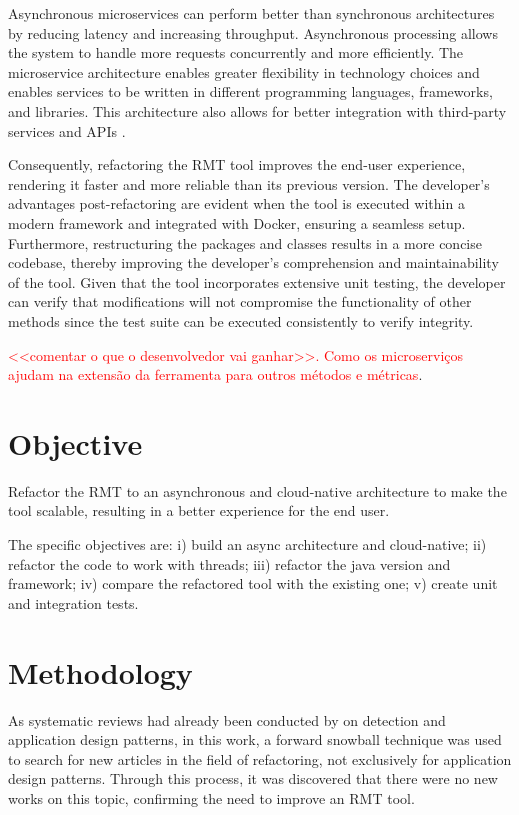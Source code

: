 Asynchronous microservices can perform better than synchronous architectures by reducing latency and increasing throughput. Asynchronous processing allows the system to handle more requests concurrently and more efficiently. The microservice architecture enables greater flexibility in technology choices and enables services to be written in different programming languages, frameworks, and libraries. This architecture also allows for better integration with third-party services and APIs \cite{larrucea2018}.

Consequently, refactoring the RMT tool improves the end-user experience, rendering it faster and more reliable than its previous version. The developer's advantages post-refactoring are evident when the tool is executed within a modern framework and integrated with Docker, ensuring a seamless setup. Furthermore, restructuring the packages and classes results in a more concise codebase, thereby improving the developer's comprehension and maintainability of the tool. Given that the tool incorporates extensive unit testing, the developer can verify that modifications will not compromise the functionality of other methods since the test suite can be executed consistently to verify integrity.

\textcolor{red}{<<comentar o que o desenvolvedor vai ganhar>>. Como os microserviços ajudam na extensão da ferramenta para outros métodos e métricas}.

\section{Objective}
Refactor the RMT to an asynchronous and cloud-native architecture to make the tool scalable, resulting in a better experience for the end user.

The specific objectives are: i) build an async architecture and cloud-native; ii) refactor the code to work with threads; iii) refactor the java version and framework; iv) compare the refactored tool with the existing one; v) create unit and integration tests.

\section{Methodology}
As systematic reviews had already been conducted by \textcite{beluzzo2018abordagem} on detection and application design patterns, in this work, a forward snowball technique was used to search for new articles in the field of refactoring, not exclusively for application design patterns. Through this process, it was discovered that there were no new works on this topic, confirming the need to improve an RMT tool.

